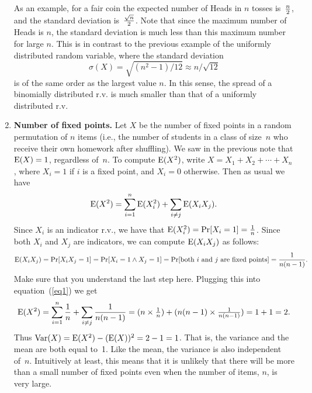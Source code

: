 \documentclass[11pt]{article}
\def\Ex#1{{\rm E}(#1)}
\def\Var#1{{\rm Var}(#1)}
\begin{document}
\begin{enumerate}
As an example, for a fair coin the expected number of Heads in $n$
tosses is~$n\over 2$, and the standard deviation
is~${{\sqrt{n}}\over 2}$. Note that since the maximum number of
Heads is $n$, the standard deviation is much less than this maximum
number for large $n$. This is in contrast to the previous example of
the uniformly distributed random variable, where the standard
deviation $$ \sigma(X) = \sqrt{(n^2-1)/12} \approx n/\sqrt{12}$$ is
of the same order as the largest value $n$. In this sense, the
spread of a binomially distributed r.v. is much smaller than that
of a uniformly distributed r.v.
\fi

\iffalse
\item {\bf Poisson distribution.} What is the variance of a Poisson r.v. X? $$
   \Ex{X^2} = \sum_{i=0}^\infty i^2{\rm e}^{-\lambda}{{\lambda^i}\over{i!}}
            = \lambda\sum_{i=1}^\infty i{\rm e}^{-\lambda}{{\lambda^{i-1}}\over{(i-1)!}}
            = \lambda\left(\sum_{i=1}^\infty (i-1){\rm e}^{-\lambda}{{\lambda^{i-1}}\over{(i-1)!}} + \sum_{i=1}^\infty {\rm e}^{-\lambda}{{\lambda^{i-1}}\over{(i-1)!}}\right)
            = \lambda(\lambda + 1).  $$
[Check you follow each of these steps.  In the last step, we have noted
that the two sums are respectively $\Ex{X}$ and $\sum_i\Pr[X=i] = 1$.]

Finally, we get $\Var{X}=\Ex{X^2}-(\Ex{X})^2 = \lambda$.
So, for a Poisson random variable, the expectation and variance are equal.
\fi

\item {\bf Number of fixed points.}  Let $X$ be the number of fixed points
in a random permutation of $n$ items (i.e., the number of students in
a class of size~$n$ who receive their own homework after shuffling).
We saw in the previous note that $\Ex{X}=1$, regardless of~$n$.
To compute $\Ex{X^2}$, write $X=X_1+X_2+\cdots+X_n$, where
$X_i=1$ if $i$ is a fixed point, and $X_i = 0$ otherwise. 
Then as usual we have
\begin{equation}\label{eq1}
   \Ex{X^2} = \sum_{i=1}^n \Ex{X_i^2} + \sum_{i\ne j}\Ex{X_iX_j}.
\end{equation}
Since $X_i$ is an indicator r.v., we have that
$\Ex{X_i^2}=\Pr[X_i=1]={1\over n}$. Since both
$X_i$ and $X_j$ are indicators, we can compute
$\Ex{X_iX_j}$  as follows: $$
   \Ex{X_iX_j} = \Pr[X_iX_j = 1] = \Pr[X_i=1\wedge X_j=1] = \Pr[\hbox{\rm both $i$ and $j$
                                                 are fixed points}]
                                        = {1\over{n(n-1)}}.  $$
Make sure that you understand the last step here.  Plugging this
into equation~(\ref{eq1}) we get $$
   \Ex{X^2} =  \sum_{i=1}^n \frac{1}{n} + \sum_{i\ne j}\frac{1}{n(n-1)} = (n\times{\textstyle{1\over n}}) + (n(n-1)\times{\textstyle{1\over{n(n-1)}}}) = 1+1 = 2.  $$
Thus $\Var{X}=\Ex{X^2}-(\Ex{X})^2 = 2-1 = 1$.  That is, the variance and
the mean are both equal to~1.  Like the mean, the variance is also
independent of~$n$.  Intuitively at least, this means that
it is unlikely that there will be more than a small number of fixed points
even when the number of items, $n$, is very large.
\end{enumerate}
\end{document}
